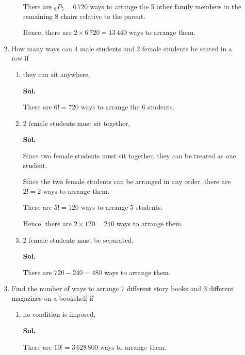 \documentclass{report}
\newcommand\permtwo[2][^n]{{}_{#1}P_{#2}}
\newcommand{\sol}[1]{

      \noindent \textbf{Sol.}
}
\def\eos{\quad\hbox{\rlap{\hbox{\vrule depth 1.5pt height 2.6mm width 0.2mm \hskip 1mm \vrule height 2.6mm width 0.2mm}}{\vbox{\hrule height 0.2mm width 1.4mm \vskip 2.8mm \hrule depth 1.5pt height -0.35mm width 1.2mm}}}}
\begin{document}
\begin{multicols*}{2}
\begin{enumerate}
\begin{enumerate}
                              There are $\permtwo[8]{5} = 6\,720$ ways to arrange the 5 other family members
                              in the remaining 8 chairs relative to the parent.

                              Hence, there are $2 \times 6\,720 = 13\,440$ ways to arrange them. $\eos$
                  \end{enumerate}

            \item How many ways can 4 male students and 2 female students be seated in a row if
                  \begin{enumerate}
                        \item they can sit anywhere, \sol{}

                              There are $6! = 720$ ways to arrange the 6 students. $\eos$

                        \item 2 female students must sit together,
                              \sol{}

                              Since two female students must sit together, they can be treated as one
                              student.

                              Since the two female students can be arranged in any order, there are $2! = 2$
                              ways to arrange them.

                              There are $5! = 120$ ways to arrange 5 students.

                              Hence, there are $2 \times 120 = 240$ ways to arrange them. $\eos$

                        \item 2 female students must be separated.
                              \sol{}

                              There are $720 - 240 = 480$ ways to arrange them. $\eos$
                  \end{enumerate}

            \item Find the number of ways to arrange 7 different story books and 3 different
                  magazines on a bookshelf if
                  \begin{enumerate}
                        \item no condition is imposed, \sol{}

                              There are $10! = 3\,628\,800$ ways to arrange them. $\eos$


\end{enumerate}
\end{enumerate}
\end{multicols*}
\end{document}
